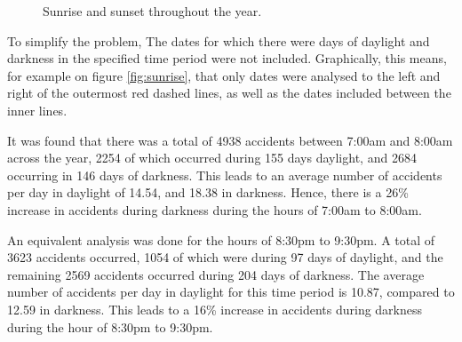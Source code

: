 \documentclass[12pt]{article}
\begin{document}
\begin{figure}[h]
\centering     %
{}
\caption{Sunrise and sunset throughout the year.}
\label{sunrise-sunset}
\end{figure}

To simplify the problem, The dates for which there were days of daylight and darkness in the specified time period were not included. Graphically, this means, for example on figure \ref{fig:sunrise}, that only dates were analysed to the left and right of the outermost red dashed lines, as well as the dates included between the inner lines.

It was found that there was a total of 4938 accidents between 7:00am and 8:00am across the year, 2254 of which occurred during 155 days daylight, and 2684 occurring in 146 days of darkness. This leads to an average number of accidents per day in daylight of 14.54, and 18.38 in darkness. Hence, there is a 26\% increase in accidents during darkness during the hours of 7:00am  to 8:00am.

An equivalent analysis was done for the hours of 8:30pm to 9:30pm. A total of 3623 accidents occurred, 1054 of which were during 97 days of daylight, and the remaining 2569 accidents occurred during 204 days of darkness. The average number of accidents per day in daylight for this time period is 10.87, compared to 12.59 in darkness. This leads to a 16\% increase in accidents during darkness during the hour of 8:30pm to 9:30pm.
\end{document}

